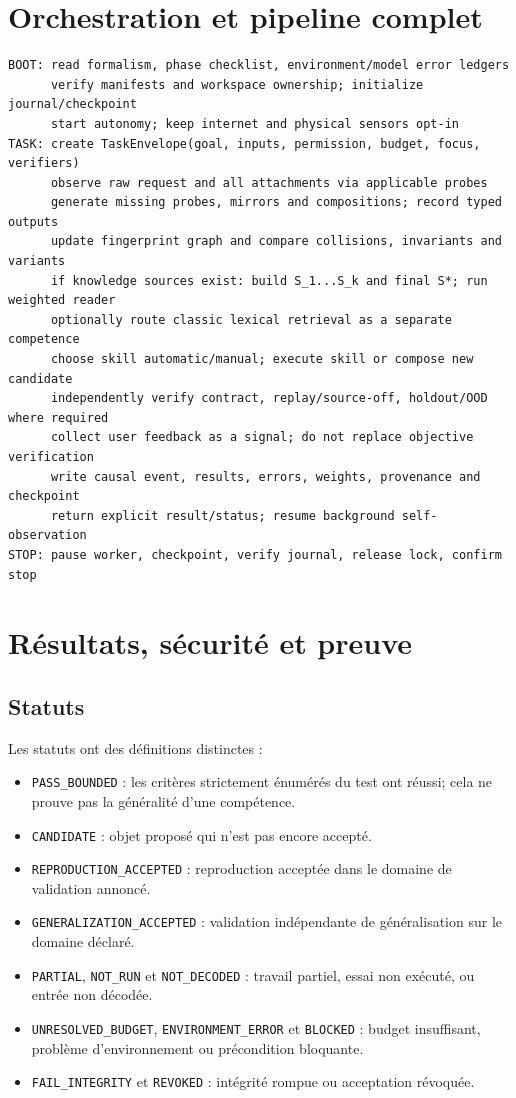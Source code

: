 \documentclass[11pt,a4paper]{report}
\begin{document}
\chapter{Orchestration et pipeline complet}
\begin{lstlisting}
BOOT: read formalism, phase checklist, environment/model error ledgers
      verify manifests and workspace ownership; initialize journal/checkpoint
      start autonomy; keep internet and physical sensors opt-in
TASK: create TaskEnvelope(goal, inputs, permission, budget, focus, verifiers)
      observe raw request and all attachments via applicable probes
      generate missing probes, mirrors and compositions; record typed outputs
      update fingerprint graph and compare collisions, invariants and variants
      if knowledge sources exist: build S_1...S_k and final S*; run weighted reader
      optionally route classic lexical retrieval as a separate competence
      choose skill automatic/manual; execute skill or compose new candidate
      independently verify contract, replay/source-off, holdout/OOD where required
      collect user feedback as a signal; do not replace objective verification
      write causal event, results, errors, weights, provenance and checkpoint
      return explicit result/status; resume background self-observation
STOP: pause worker, checkpoint, verify journal, release lock, confirm stop
\end{lstlisting}

\chapter{Résultats, sécurité et preuve}
\section{Statuts}
Les statuts ont des définitions distinctes :
\begin{itemize}
\item \texttt{PASS\_BOUNDED} : les critères strictement énumérés du test ont réussi; cela ne prouve pas la généralité d'une compétence.
\item \texttt{CANDIDATE} : objet proposé qui n'est pas encore accepté.
\item \texttt{REPRODUCTION\_ACCEPTED} : reproduction acceptée dans le domaine de validation annoncé.
\item \texttt{GENERALIZATION\_ACCEPTED} : validation indépendante de généralisation sur le domaine déclaré.
\item \texttt{PARTIAL}, \texttt{NOT\_RUN} et \texttt{NOT\_DECODED} : travail partiel, essai non exécuté, ou entrée non décodée.
\item \texttt{UNRESOLVED\_BUDGET}, \texttt{ENVIRONMENT\_ERROR} et \texttt{BLOCKED} : budget insuffisant, problème d'environnement ou précondition bloquante.
\item \texttt{FAIL\_INTEGRITY} et \texttt{REVOKED} : intégrité rompue ou acceptation révoquée.
\end{itemize}
\end{document}
